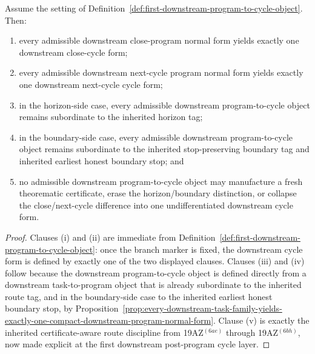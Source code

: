 \begin{proposition}
\label{prop:every-downstream-program-normal-form-yields-exactly-one-controlled-downstream-cycle-form}
Assume the setting of Definition~\ref{def:first-downstream-program-to-cycle-object}. Then:
\begin{enumerate}[label=(\roman*)]
  \item every admissible downstream close-program normal form yields exactly one downstream close-cycle form;
  \item every admissible downstream next-cycle program normal form yields exactly one downstream next-cycle cycle form;
  \item in the horizon-side case, every admissible downstream program-to-cycle object remains subordinate to the inherited horizon tag;
  \item in the boundary-side case, every admissible downstream program-to-cycle object remains subordinate to the inherited stop-preserving boundary tag and inherited earliest honest boundary stop; and
  \item no admissible downstream program-to-cycle object may manufacture a fresh theorematic certificate, erase the horizon/boundary distinction, or collapse the close/next-cycle difference into one undifferentiated downstream cycle form.
\end{enumerate}
\end{proposition}

\begin{proof}
Clauses (i) and (ii) are immediate from Definition~\ref{def:first-downstream-program-to-cycle-object}: once the branch marker is fixed, the downstream cycle form is defined by exactly one of the two displayed clauses. Clauses (iii) and (iv) follow because the downstream program-to-cycle object is defined directly from a downstream task-to-program object that is already subordinate to the inherited route tag, and in the boundary-side case to the inherited earliest honest boundary stop, by Proposition~\ref{prop:every-downstream-task-family-yields-exactly-one-compact-downstream-program-normal-form}. Clause (v) is exactly the inherited certificate-aware route discipline from 19AZ$^{(6ae)}$ through 19AZ$^{(6bh)}$, now made explicit at the first downstream post-program cycle layer.
\end{proof}

